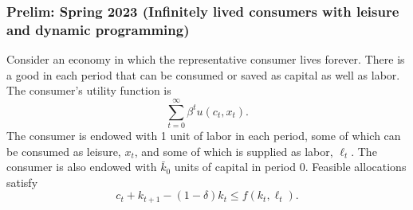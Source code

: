 \documentclass[11pt,english]{article}
\begin{document}
\subsubsection{Prelim: Spring 2023 (Infinitely lived consumers with leisure and dynamic programming)}
Consider an economy in which the representative consumer lives forever. There
is a good in each period that can be consumed or saved as capital as well as
labor. The consumer's utility function is
\[
    \sum_{t=0}^{\infty} \beta^t u(c_t, x_t).
\]
The consumer is endowed with 1 unit of labor in each period, some of which can
be consumed as leisure, $x_t$, and some of which is supplied as labor,
$\ell_t$. The consumer is also endowed with $\bar{k}_0$ units of capital in
period 0. Feasible allocations satisfy
\[
    c_t + k_{t+1} - (1-\delta)k_t \leq f(k_t, \ell_t).
\]
 
\end{document}

